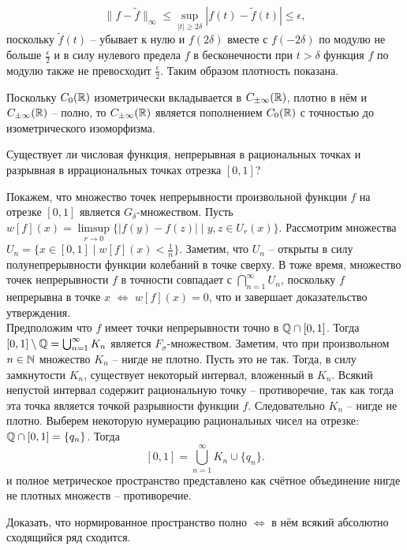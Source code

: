 \begin{solve}
\begin{enumerate}
        \[
            \|f - \tilde{f}\|_{\infty} \leq \sup\limits_{|t| \geq 2\delta} |f(t) - \tilde{f}(t)| \leq \epsilon,
        \]
        поскольку $\tilde{f}(t)$ -- убывает к нулю и $f(2\delta)$ вместе с $f(-2\delta)$ по модулю не больше $\frac{\epsilon}{2}$ и в силу нулевого предела $f$ в бесконечности при $t > \delta$ функция $f$ по модулю также не превосходит $\frac{\epsilon}{2}$. Таким образом плотность показана.
    \end{enumerate}
    Поскольку $C_0(\mathbb{R})$ изометрически вкладывается в $C_{\pm\infty}(\mathbb{R})$, плотно в нём и $C_{\pm\infty}(\mathbb{R})$ -- полно, то $C_{\pm\infty}(\mathbb{R})$ является пополнением $C_0(\mathbb{R})$ с точностью до изометрического изоморфизма.
\end{solve}
\begin{task}[\S 2.7]
    Существует ли числовая функция, непрерывная в рациональных точках и разрывная в иррациональных точках отрезка $[0, 1]$?
\end{task}
\begin{solve}
    Покажем, что множество точек непрерывности произвольной функции $f$ на отрезке $[0, 1]$ является $G_\delta$-множеством. Пусть $w[f](x) = \limsup\limits_{r \rightarrow 0}\{|f(y) - f(z)| \mid y, z \in U_r(x)\}$. Рассмотрим множества $U_n = \{ x \in [0, 1] \mid w[f](x) < \frac{1}{n}\}$. Заметим, что $U_n$ -- открыты в силу полунепрерывности функции колебаний в точке сверху. В тоже время, множество точек непрерывности $f$ в точности совпадает с $\bigcap_{n = 1}^{\infty} U_n$, поскольку $f$ непрерывна в точке $x$ $\Longleftrightarrow$ $w[f](x) = 0$, что и завершает доказательство утверждения. \\
    Предположим что $f$ имеет точки непрерывности точно в $\mathbb{Q} \cap [0, 1]$. Тогда $[0, 1] \setminus \mathbb{Q} = \bigcup_{n = 1}^{\infty} K_n$ является $F_\sigma$-множеством. Заметим, что при произвольном $n \in \mathbb{N}$ множество $K_n$ -- нигде не плотно. Пусть это не так. Тогда, в силу замкнутости $K_n$, существует некоторый интервал, вложенный в $K_n$. Всякий непустой интервал содержит рациональную точку -- противоречие, так как тогда эта точка является точкой разрывности функции $f$. Следовательно $K_n$ -- нигде не плотно. Выберем некоторую нумерацию рациональных чисел на отрезке: $\mathbb{Q} \cap [0, 1] = \{q_n\}$. Тогда
    \[
        [0, 1] = \bigcup_{n = 1}^{\infty} K_n \cup \{q_n\}.
    \]
    и полное метрическое пространство представлено как счётное объединение нигде не плотных множеств -- противоречие.
\end{solve}
\begin{task}[\S 4.1]
    Доказать, что нормированное пространство полно $\Longleftrightarrow$ в нём всякий абсолютно сходящийся ряд сходится.
\end{task}
